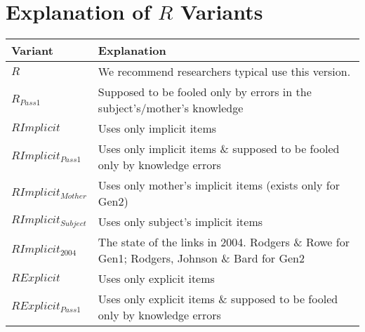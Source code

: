 \documentclass{article}\usepackage{graphicx, color}
\begin{document}
\section{Explanation of $R$ Variants}
\begin{tabular}{l l}
\textbf{Variant} & \textbf{Explanation} \\
\hline
$R$ & We recommend researchers typical use this version. \\
$R_{Pass1}$ & Supposed to be fooled only by errors in the subject's/mother's knowledge \\
\hline
$RImplicit$ & Uses only implicit items \\
$RImplicit_{Pass1}$ & Uses only implicit items \& supposed to be fooled only by knowledge errors \\
$RImplicit_{Mother}$ & Uses only mother's implicit items (exists only for Gen2)\\
$RImplicit_{Subject}$ & Uses only subject's implicit items\\
$RImplicit_{2004}$ & The state of the links in 2004.  Rodgers \& Rowe for Gen1; Rodgers, Johnson \& Bard for Gen2 \\
\hline
$RExplicit$ & Uses only explicit items \\
$RExplicit_{Pass1}$ & Uses only explicit items \& supposed to be fooled only by knowledge errors \\

\hline
\end{tabular}
\end{document}
